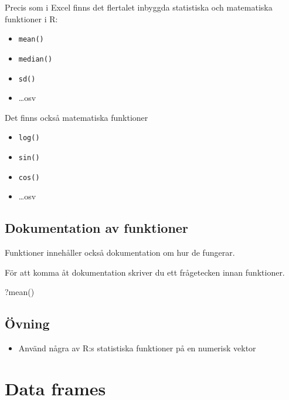 \documentclass[
]{book}
\newenvironment{Shaded}{\begin{snugshade}}{\end{snugshade}}
\newcommand{\FunctionTok}[1]{\textcolor[rgb]{0.00,0.00,0.00}{#1}}
\newcommand{\NormalTok}[1]{#1}
\providecommand{\tightlist}{%
  \setlength{\itemsep}{0pt}\setlength{\parskip}{0pt}}
\begin{document}
Precis som i Excel finns det flertalet inbyggda statistiska och matematiska funktioner i R:

\begin{itemize}
\tightlist
\item
  \texttt{mean()}
\item
  \texttt{median()}
\item
  \texttt{sd()}
\item
  \ldots osv
\end{itemize}

Det finns också matematiska funktioner

\begin{itemize}
\tightlist
\item
  \texttt{log()}
\item
  \texttt{sin()}
\item
  \texttt{cos()}
\item
  \ldots osv
\end{itemize}

\hypertarget{dokumentation-av-funktioner}{%
\subsection{Dokumentation av funktioner}\label{dokumentation-av-funktioner}}

Funktioner innehåller också dokumentation om hur de fungerar.

För att komma åt dokumentation skriver du ett frågetecken innan funktioner.

\begin{Shaded}
\begin{Highlighting}[]
\NormalTok{?}\FunctionTok{mean}\NormalTok{()}
\end{Highlighting}
\end{Shaded}

\hypertarget{uxf6vning}{%
\subsection{Övning}\label{uxf6vning}}

\begin{itemize}
\tightlist
\item
  Använd några av R:s statistiska funktioner på en numerisk vektor
\end{itemize}

\hypertarget{data-frames}{%
\section{Data frames}\label{data-frames}}
\end{document}
